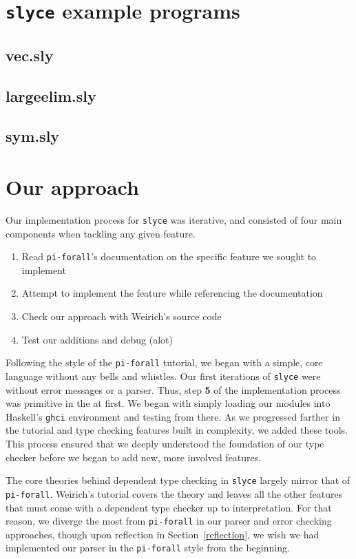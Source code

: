 


\section{\texttt{slyce} example programs}
\subsection{vec.sly}
\subsection{largeelim.sly}
\subsection{sym.sly}

\section{Our approach}
Our implementation process for \texttt{slyce} was iterative, and consisted of four main components when tackling any given feature.
\begin{enumerate}
    \item Read \texttt{pi-forall}'s documentation on the specific feature we sought to implement
    \item Attempt to implement the feature while referencing the documentation
    \item Check our approach with Weirich's source code
    \item Test our additions and debug (alot)
\end{enumerate}

Following the style of the \texttt{pi-forall} tutorial, we began with a simple, core language without any bells and whistles.
Our first iterations of \texttt{slyce} were without error messages or a parser.
Thus, step \textbf{5} of the implementation process was primitive in the at first. 
We began with simply loading our modules into Haskell's \texttt{ghci} environment and testing from there.
As we progressed farther in the tutorial and type checking features built in complexity, we added these tools.
This process ensured that we deeply understood the foundation of our type checker before we began to add new, more involved features. 

The core theories behind dependent type checking in \texttt{slyce} largely mirror that of \texttt{pi-forall}.
Weirich's tutorial covers the theory and leaves all the other features that must come with a dependent type checker up to interpretation.
For that reason, we diverge the most from \texttt{pi-forall} in our parser and error checking approaches, though upon reflection in Section~\ref{reflection}, we wish we had implemented our parser in the \texttt{pi-forall} style from the beginning.

